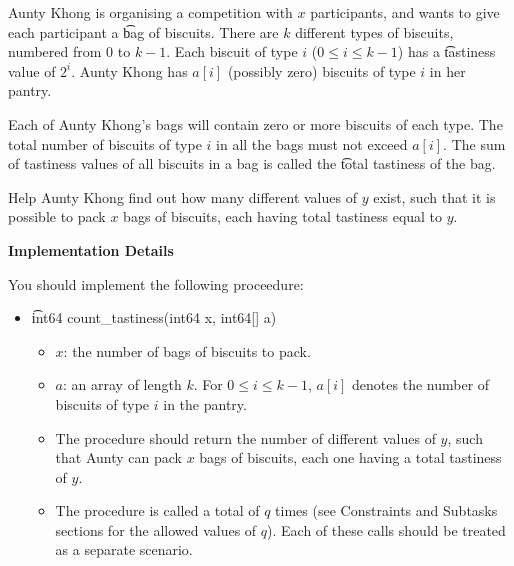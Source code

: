 Aunty Khong is organising a competition with $x$ participants, and wants to give each participant a \t{bag of biscuits}. There are $k$ different types of biscuits, numbered from $0$ to $k-1$. Each biscuit of type $i$ ($0 \leq i \leq k-1$) has a \t{tastiness value} of $2^i$. Aunty Khong has $a[i]$ (possibly zero) biscuits of type $i$ in her pantry.

Each of Aunty Khong's bags will contain zero or more biscuits of each type. The total number of biscuits of type $i$ in all the bags must not exceed $a[i]$. The sum of tastiness values of all biscuits in a bag is called the \t{total tastiness} of the bag.

Help Aunty Khong find out how many different values of $y$ exist, such that it is possible to pack $x$ bags of biscuits, each having total tastiness equal to $y$. 

\textbf{Implementation Details}

You should implement the following proceedure:

\begin{itemize}
\item \t{int64 count\_tastiness(int64 x, int64[] a)}
\begin{itemize}
\item $x$: the number of bags of biscuits to pack.
\item $a$: an array of length $k$. For $0 \leq i \leq k-1$, $a[i]$ denotes the number of biscuits of type $i$ in the pantry.
\item The procedure should return the number of different values of $y$, such that Aunty can pack $x$ bags of biscuits, each one having a total tastiness of $y$.
\item The procedure is called a total of $q$ times (see Constraints and Subtasks sections for the allowed values of $q$). Each of these calls should be treated as a separate scenario.
\end{itemize}
\end{itemize}


